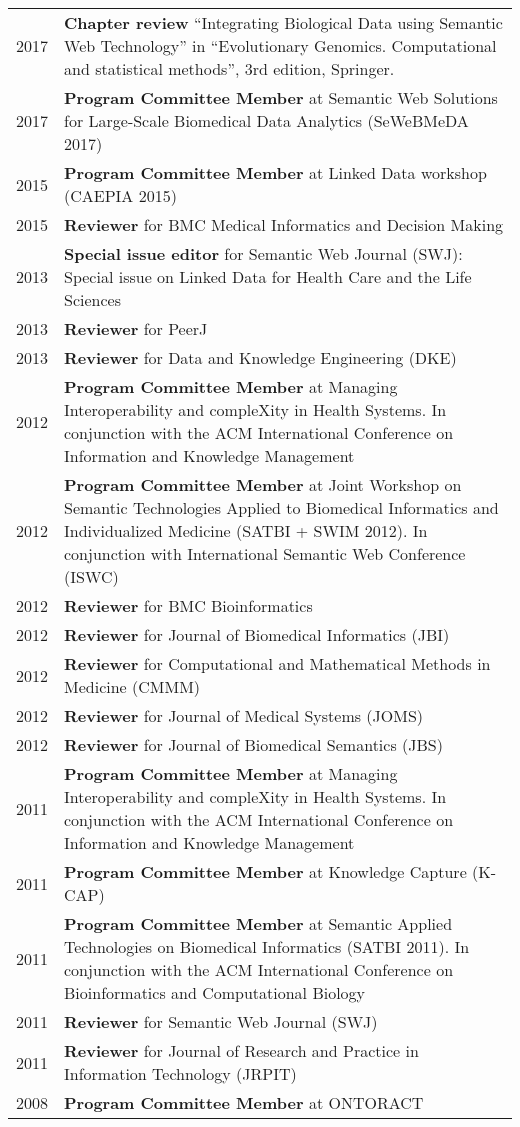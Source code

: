 \documentclass[11pt,fullpage]{article}
\begin{document}
\begin{longtable}{p{0.5in}|p{5.5in}}

2017 & \textbf{Chapter review} ``Integrating Biological Data using Semantic Web Technology'' in ``Evolutionary Genomics. Computational and statistical methods'', 3rd edition, Springer. \\
2017 & \textbf{Program Committee Member} at Semantic Web Solutions for Large-Scale Biomedical Data Analytics (SeWeBMeDA 2017) \\
2015 & \textbf{Program Committee Member} at Linked Data workshop (CAEPIA 2015) \\
2015  & \textbf{Reviewer} for BMC Medical Informatics and Decision Making \\
2013 & {\bf Special issue editor} for Semantic Web Journal (SWJ): Special issue on Linked Data for Health Care and the Life Sciences \\
2013  & \textbf{Reviewer} for PeerJ \\
2013  & \textbf{Reviewer} for Data and Knowledge Engineering (DKE) \\

2012 & \textbf{Program Committee Member} at Managing Interoperability and compleXity in Health Systems. In conjunction with the ACM International Conference on Information and Knowledge Management\\
2012 & \textbf{Program Committee Member} at Joint Workshop on Semantic Technologies Applied to Biomedical Informatics and Individualized Medicine (SATBI + SWIM 2012). In conjunction with International Semantic Web Conference (ISWC)\\
2012  & \textbf{Reviewer} for BMC Bioinformatics \\
2012  & \textbf{Reviewer} for Journal of Biomedical Informatics (JBI) \\
2012  & \textbf{Reviewer} for Computational and Mathematical Methods in Medicine (CMMM) \\
2012  & \textbf{Reviewer} for Journal of Medical Systems (JOMS) \\
2012  & \textbf{Reviewer} for Journal of Biomedical Semantics (JBS) \\
2011 & \textbf{Program Committee Member} at Managing Interoperability and compleXity in Health Systems. In conjunction with the ACM International Conference on Information and Knowledge Management\\
2011 & \textbf{Program Committee Member} at Knowledge Capture (K-CAP)\\
2011 & \textbf{Program Committee Member} at Semantic Applied Technologies on Biomedical Informatics (SATBI 2011). In conjunction with the ACM International Conference on Bioinformatics and Computational Biology\\
2011  & \textbf{Reviewer} for Semantic Web Journal (SWJ) \\
2011  & \textbf{Reviewer} for Journal of Research and Practice in Information Technology (JRPIT)\\
2008 & \textbf{Program Committee Member} at ONTORACT \\

\end{longtable}
\end{document}
